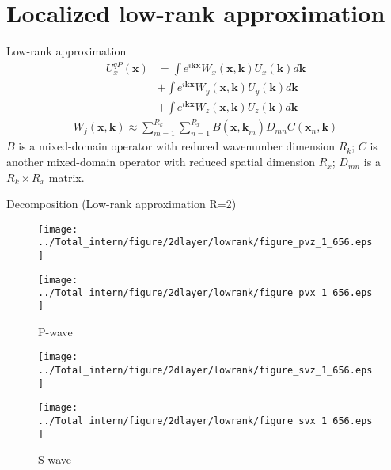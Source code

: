\documentclass[aspectratio=169]{beamer}
\begin{document}
\section{Localized low-rank approximation}
\begin{frame}{Low-rank approximation}
\begin{eqnarray*}
U^{qP}_x(\mathbf{x})&=\int e^{i\mathbf{kx}}W_x(\mathbf{x,k})U_x(\mathbf{k})d\mathbf{k}\\
                    &+\int e^{i\mathbf{kx}}W_y(\mathbf{x,k})U_y(\mathbf{k})d\mathbf{k}\\
                    &+\int e^{i\mathbf{kx}}W_z(\mathbf{x,k})U_z(\mathbf{k})d\mathbf{k}
\end{eqnarray*}
\begin{eqnarray*}
W_j(\mathbf{x,k})\approx \sum^{R_k}_{m=1}\sum^{R_x}_{n=1}B(\mathbf{x,k}_{m})D_{m n}C(\mathbf{x}_{n},\mathbf{k})
\end{eqnarray*}
$B$ is a mixed-domain operator with reduced wavenumber dimension $R_k$; $C$ is another mixed-domain operator with reduced spatial dimension $R_x$; $D_{m n}$ is a $R_k \times R_x$ matrix. 
\end{frame}
\begin{frame}{Decomposition (Low-rank approximation R=2)}
\center
   \begin{figure}[ht]
        \begin{minipage}[b]{0.25\linewidth}
            \centering
            \texttt{[image: ../Total\_intern/figure/2dlayer/lowrank/figure\_pvz\_1\_656.eps]}

            \texttt{[image: ../Total\_intern/figure/2dlayer/lowrank/figure\_pvx\_1\_656.eps]}
            \caption{P-wave}
        \end{minipage}
        \hspace{0.5cm}
        \begin{minipage}[b]{0.25\linewidth}
            \centering
            \texttt{[image: ../Total\_intern/figure/2dlayer/lowrank/figure\_svz\_1\_656.eps]}

            \texttt{[image: ../Total\_intern/figure/2dlayer/lowrank/figure\_svx\_1\_656.eps]}
            \caption{S-wave}
        \end{minipage}
    \end{figure}

\end{frame}
\end{document}

